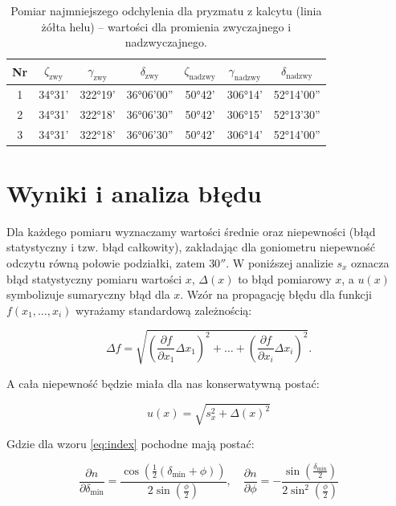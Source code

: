 \documentclass[12pt]{article}
\begin{document}
\begin{table}[H]
    \centering
    \begin{tabular}{c|ccc|ccc}
        \toprule
        \textbf{Nr} & $\zeta_{\mathrm{zwy}}$ & $\gamma_{\mathrm{zwy}}$ & $\delta_{\mathrm{zwy}}$ & $\zeta_{\mathrm{nadzwy}}$ & $\gamma_{\mathrm{nadzwy}}$ & $\delta_{\mathrm{nadzwy}}$ \\
        \midrule
        1 & 34°31'  & 322°19'  & 36°06'00'' & 50°42'  & 306°14'  & 52°14'00'' \\
        2 & 34°31'  & 322°18'  & 36°06'30'' & 50°42'  & 306°15'  & 52°13'30'' \\
        3 & 34°31'  & 322°18'  & 36°06'30'' & 50°42'  & 306°14'  & 52°14'00'' \\
        \bottomrule
    \end{tabular}
    \caption{Pomiar najmniejszego odchylenia dla pryzmatu z kalcytu (linia żółta helu) – wartości dla promienia zwyczajnego i nadzwyczajnego.}
    \label{tab:katy_odchylenia_kalcyt}
\end{table}

\section{Wyniki i analiza błędu}
Dla każdego pomiaru wyznaczamy wartości średnie oraz niepewności (błąd statystyczny i tzw. błąd całkowity), zakładając dla goniometru niepewność odczytu równą połowie podziałki, zatem $30''$.  
W poniźszej analizie $s_x$ oznacza błąd statystyczny pomiaru wartości $x$, $\Delta(x)$ to błąd pomiarowy $x$, a $u(x)$ symbolizuje sumaryczny błąd dla $x$.
Wzór na propagację błędu dla funkcji $f(x_1,\ldots,x_i)$ wyrażamy standardową zależnością:

\begin{equation}
    \Delta f = \sqrt{\left(\frac{\partial f}{\partial x_1}\Delta x_1\right)^2 + \dots + \left(\frac{\partial f}{\partial x_i}\Delta x_i\right)^2}.
    \label{eq:error_propagation}
\end{equation}

A cała niepewność będzie miała dla nas konserwatywną postać:

\begin{equation}
    u(x) = \sqrt{s^2_x + \Delta(x)^2}
    \label{eq:full_error}
\end{equation}

Gdzie dla wzoru \eqref{eq:index} pochodne mają postać:

\begin{equation}
    \frac{\partial n}{\partial \delta_{\mathrm{min}}} = \frac{\cos(\frac{1}{2}(\delta_{\mathrm{min}}+\phi))}{2\sin(\frac{\phi}{2})}, \quad
    \frac{\partial n}{\partial \phi} = -\frac{\sin(\frac{\delta_{\mathrm{min}}}{2})}{2\sin^2(\frac{\phi}{2})}
    \label{eq:index_err}
\end{equation}
\end{document}
